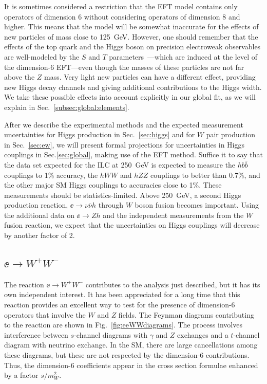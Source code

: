 It is sometimes considered a restriction that the EFT model contains only operators of dimension 6 without considering operators of dimension 8 and higher.    This means that the model will be somewhat inaccurate for the effects of new particles of mass close to 125~GeV.  However, one should remember that the effects of the top quark and the Higgs boson on precision electroweak observables are well-modeled by the $S$ and $T$ parameters~\cite{Peskin:1990zt}---which are induced at the level of the dimension-6 EFT---even though the masses of these particles are not far above the $Z$ mass.   Very light new particles can have a different effect, providing new Higgs decay channels and giving additional contributions to the Higgs width.  We take these possible effects into account explicitly in our global fit, as we will explain in Sec.~\ref{subsec:global:elements}.

After we describe the experimental methods and the expected measurement uncertainties for Higgs production in  Sec.~\ref{sec:higgs} and for $W$ pair production in Sec.~\ref{sec:ew},  we will present formal  projections for uncertainties in 
Higgs couplings in Sec.\ref{sec:global}, making use of the EFT  method.  Suffice it to say that the data set expected for the ILC at 250~GeV is expected to measure the $hb\bar b$ couplings to 1\% accuracy, the $hWW$ and $hZZ$ couplings to better than 0.7\%, and the other 
major SM Higgs couplings to accuracies close to 1\%.    These measurements should be 
statistics-limited.  Above 250~GeV, a second Higgs production reaction, $\ee\to \nu\bar\nu h$ through $W$ boson fusion becomes important.  Using the additional data on $\ee\to Zh$ and the independent measurements from the $W$ fusion reaction, we expect that the uncertainties on Higgs couplings will decrease by another factor of 2. 


\subsection{$\ee \to W^+W^-$}
\label{subsec:phys_WW}
The reaction $\ee\to W^+W^-$ contributes to the analysis just described, but it has its own independent interest.  It has been appreciated for  a long time that this reaction provides an excellent way to test for the presence of dimension-6 operators that involve the $W$ and $Z$ fields.   The Feynman diagrams contributing to the reaction are shown in Fig.~\ref{fig:eeWWdiagrams}.   The process involves interference between $s$-channel diagrams with $\gamma$ and $Z$ exchanges and a $t$-channel diagram with neutrino exchange.  In the SM, there are large cancellations among these diagrams, but these are not respected by the dimension-6 contributions.   Thus, the dimension-6 coefficients appear in the cross section formulae enhanced by a factor $s/m_W^2$. 

